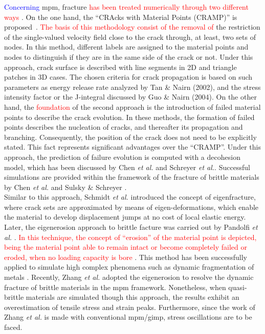 \documentclass[preprint,12pt,a4paper]{elsarticle}
\newcommand{\PNA}[1]{
  \textcolor{red}{{#1}}
}
\newcommand{\MMP}[1]{
  \textcolor{blue}{{#1}}
}
\begin{document}
\MMP{Concerning} \acrshort{mpm}, fracture \PNA{has been treated numerically through two different ways}. On the one hand, the ``CRAcks with Material Points (CRAMP)'' is proposed~\cite{Nairn_2003,Nairn_2006}. \PNA{The basis of this methodology consist of the removal of} the restriction
of the single-valued velocity field close to the crack through, at least, two sets of nodes. In this method, different labels are assigned to the material points
and nodes to distinguish if they are in the same side of the crack or
not. Under this approach, crack surface is described with line segments
in 2D and triangle patches in 3D cases. The chosen criteria for crack
propagation is based on such parameters as energy release rate
analyzed by Tan \& Nairn (2002)\cite{Nairn_2002}, and the stress
intensity factor or the J-integral discussed by Guo \& Nairn
(2004)\cite{Nairn_2004}. 
On the other hand, the \PNA{foundation} of the second approach is the introduction of failed
material points to describe the crack evolution. In these methods, the
formation of failed points describes the nucleation of cracks, and
thereafter its propagation and branching. Consequently, the position
of the crack does not need to be explicitly stated. This fact represents
significant advantages over the ``CRAMP''. Under this approach, the
prediction of failure evolution is computed with a decohesion model,
which has been discussed by Chen {\it et al.}\cite{Zhenmao_2005} and
Schreyer {\it et al.}\cite{Schreyer_2002}. Successful simulations are provided within the framework of the fracture of brittle materials by Chen {\it et
  al.} \cite{Chen_2002,Chen_2003} and Sulsky \& Schreyer
\cite{Sulsky_2004}.\\

Similar to this approach, Schmidt {\it et al.}
\cite{Schmidt_2009} introduced the concept of eigenfracture, where
crack sets are approximated by means of eigen-deformations, which
enable the material to develop displacement jumps at no cost of local
elastic energy. Later, the eigenerosion approach to brittle facture
was carried out by Pandolfi {\it et al.}
\cite{Pandolfi_2012,Pandolfi_2013}. \PNA{In this technique, the concept of ``erosion'' of
the material point is depicted, being the material point able to remain intact or become completely failed or eroded, when no loading
capacity is bore}. This method has been successfully applied to simulate high
complex phenomena such as dynamic fragmentation of metals
\cite{Li_2015}. Recently, Zhang {\it et al.}
\cite{Zhang_EE_2020} adopted the eigenerosion to resolve the dynamic
fracture of brittle materials in the \acrshort{mpm}
framework. Nonetheless, when quasi-brittle materials are simulated
though this approach, the results exhibit an overestimation of tensile
stress and strain peaks. Furthermore, since the work of Zhang {\it et al.}
\cite{Zhang_EE_2020} is made with conventional \acrshort{mpm}/\acrshort{gimp}, stress oscillations are to be faced.\\
\end{document}
